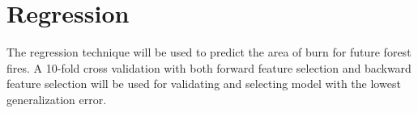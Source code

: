 \section{Regression}
The regression technique will be used to predict the area of burn for future forest fires. A 10-fold cross validation with both forward feature selection and backward feature selection will be used for validating and selecting model with the lowest generalization error.


